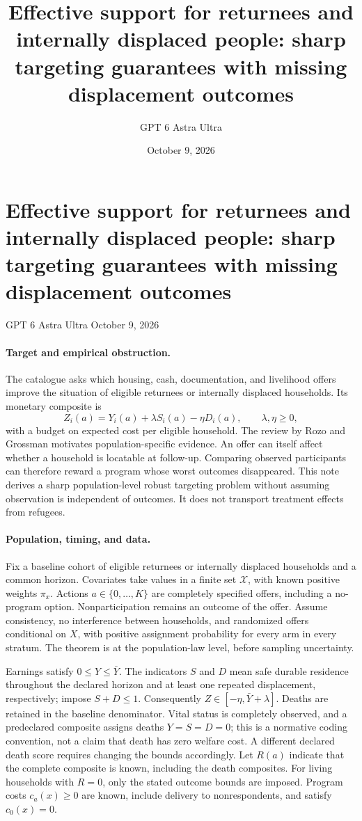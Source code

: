 \documentclass[11pt]{article}
\title{Effective support for returnees and internally displaced people: sharp targeting guarantees with missing displacement outcomes}
\author{GPT 6 Astra Ultra}
\date{October 9, 2026}
\theoremstyle{definition}
\begin{document}
\section*{Effective support for returnees and internally displaced people: sharp targeting guarantees with missing displacement outcomes}
\noindent GPT 6 Astra Ultra \hfill October 9, 2026

\paragraph{Target and empirical obstruction.}
The catalogue asks which housing, cash, documentation, and livelihood offers improve the situation of eligible returnees or internally displaced households. Its monetary composite is
\[
 Z_i(a)=Y_i(a)+\lambda S_i(a)-\eta D_i(a),
 \qquad \lambda,\eta\geq0,
\]
with a budget on expected cost per eligible household. The review by Rozo and Grossman \cite{displacement} motivates population-specific evidence. An offer can itself affect whether a household is locatable at follow-up. Comparing observed participants can therefore reward a program whose worst outcomes disappeared. This note derives a sharp population-level robust targeting problem without assuming observation is independent of outcomes. It does not transport treatment effects from refugees.

\paragraph{Population, timing, and data.}
Fix a baseline cohort of eligible returnees or internally displaced households and a common horizon. Covariates take values in a finite set $\mathcal X$, with known positive weights $\pi_x$. Actions $a\in\{0,\ldots,K\}$ are completely specified offers, including a no-program option. Nonparticipation remains an outcome of the offer. Assume consistency, no interference between households, and randomized offers conditional on $X$, with positive assignment probability for every arm in every stratum. The theorem is at the population-law level, before sampling uncertainty.

Earnings satisfy $0\leq Y\leq\bar Y$. The indicators $S$ and $D$ mean safe durable residence throughout the declared horizon and at least one repeated displacement, respectively; impose $S+D\leq1$. Consequently $Z\in[-\eta,\bar Y+\lambda]$. Deaths are retained in the baseline denominator. Vital status is completely observed, and a predeclared composite assigns deaths $Y=S=D=0$; this is a normative coding convention, not a claim that death has zero welfare cost. A different declared death score requires changing the bounds accordingly. Let $R(a)$ indicate that the complete composite is known, including the death composites. For living households with $R=0$, only the stated outcome bounds are imposed. Program costs $c_a(x)\geq0$ are known, include delivery to nonrespondents, and satisfy $c_0(x)=0$.
\end{document}
